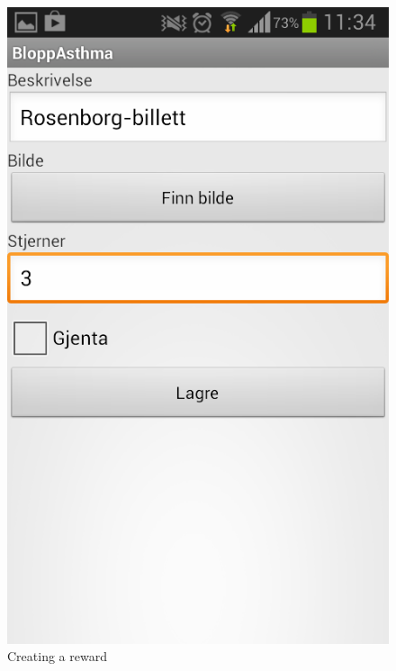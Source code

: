 \begin{figure}
	\begin{minipage}[t]{0.4\linewidth}
		\centering
			\includegraphics[width=0.20\paperwidth]{Pictures/new-screenshots/create-award.png}
		\caption{Creating a reward}
		\label{fig:parent-create-reward}
	\end{minipage}
	 \hspace{3cm}
	 \begin{minipage}[t]{0.4\linewidth}
		\centering

\end{minipage}
\end{figure}
